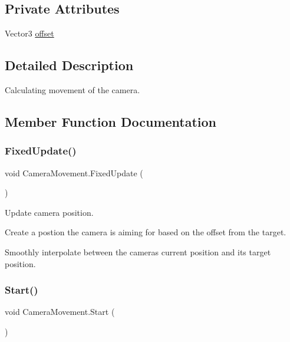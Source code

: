 \subsection*{Private Attributes}
\begin{DoxyCompactItemize}
\item 
Vector3 \mbox{\hyperlink{class_camera_movement_a76c04e8960b9aa6db0ac10da72a3ef14}{offset}}
\end{DoxyCompactItemize}


\subsection{Detailed Description}
Calculating movement of the camera. 

\subsection{Member Function Documentation}
\mbox{\label{class_camera_movement_aa245255484cfc41547a4e1eaa8cf07ea}} 
\subsubsection{\texorpdfstring{FixedUpdate()}{FixedUpdate()}}
{\footnotesize\ttfamily void Camera\+Movement.\+Fixed\+Update (\begin{DoxyParamCaption}{ }\end{DoxyParamCaption})\hspace{0.3cm}{\ttfamily [private]}}



Update camera position. 

Create a postion the camera is aiming for based on the offset from the target.

Smoothly interpolate between the camera\textquotesingle{}s current position and it\textquotesingle{}s target position. \mbox{\label{class_camera_movement_a3d5bf0407152d0e16efafa655bfc15e9}} 
\subsubsection{\texorpdfstring{Start()}{Start()}}
{\footnotesize\ttfamily void Camera\+Movement.\+Start (\begin{DoxyParamCaption}{ }\end{DoxyParamCaption})\hspace{0.3cm}{\ttfamily [private]}}



